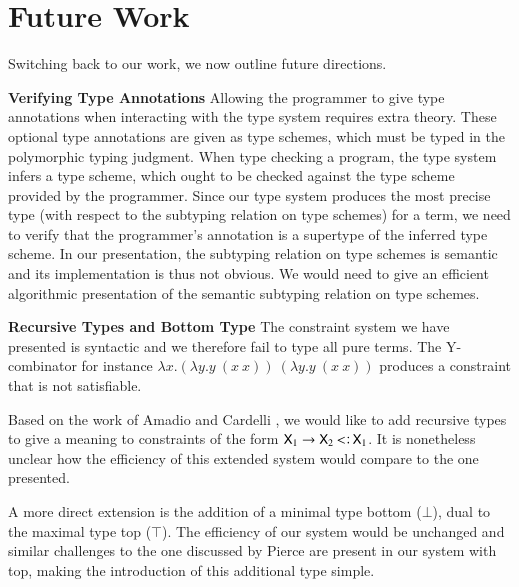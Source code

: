 \documentclass{report}
\begin{document}
  \section{Future Work}
  Switching back to our work, we now outline future directions.
  
  \noindent\textbf{Verifying Type Annotations}
  Allowing the programmer to give type annotations when interacting with
  the type system requires extra theory. These optional type annotations
  are given as type schemes, which must be typed
  in the polymorphic typing judgment. When type checking a program,
  the type system infers a type scheme, which ought to be checked against the
  type scheme provided by the programmer. Since our type system produces the most
  precise type (with respect to the subtyping relation on type schemes)
  for a term, we need to verify that the programmer's annotation
  is a supertype of the inferred type scheme. In our presentation, the subtyping relation
  on type schemes  is semantic and its implementation is thus not obvious.
  We would need to give an efficient algorithmic presentation of the semantic subtyping
  relation on type schemes.
  
  
  
  \noindent\textbf{Recursive Types and Bottom Type}
  The constraint system we have presented is syntactic and we therefore fail
  to type all pure terms. The Y-combinator for instance
  $\lambda x.(\lambda y.y\ (x\ x))\ (\lambda y.y\ (x\ x))$ produces a constraint
  that is not satisfiable.
  
  Based on the work of Amadio and Cardelli \cite{amadiocardelli93},
  we would like to add recursive types to give a meaning to constraints
  of the form $\type{X}_1\fun\type{X}_2\subtype\type{X}_1$. It is nonetheless unclear
  how the efficiency of this extended system would compare to the one presented.
  
  A more direct extension is the addition of a minimal type bottom ($\bot$), dual to
  the maximal type top ($\top$). The efficiency of our system would be unchanged
  and similar challenges to the one discussed by Pierce \cite{Pierce:BQB} are
  present in our system with top, making the introduction of this additional
  type simple.
  
\end{document}
